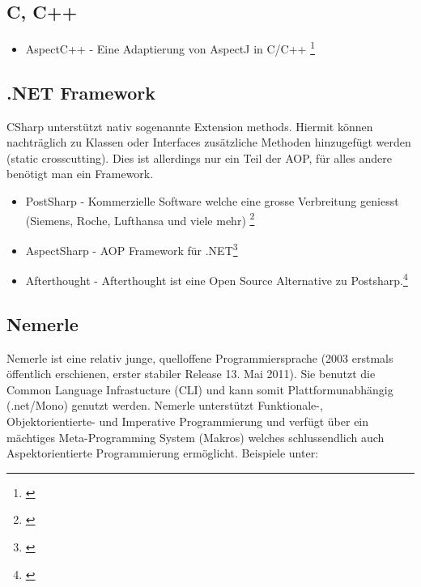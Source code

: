 \subsection{C, C++}

\begin{itemize}
\item AspectC++ - Eine Adaptierung von AspectJ in C/C++ \footnote{\cite{net:aspectc}}
\end{itemize}

\subsection{.NET Framework}

CSharp unterstützt nativ sogenannte Extension methods. Hiermit können nachträglich zu Klassen oder Interfaces zusätzliche Methoden hinzugefügt werden (static crosscutting). Dies ist allerdings nur ein Teil der AOP, für alles andere benötigt man ein Framework.

\begin{itemize}
\item PostSharp - Kommerzielle Software welche eine grosse Verbreitung geniesst (Siemens, Roche, Lufthansa und viele mehr) \footnote{\cite{net:postsharp}}
\item AspectSharp - AOP Framework für .NET\footnote{\cite{net:aspectsharp}}
\item Afterthought - Afterthought ist eine Open Source Alternative zu Postsharp.\footnote{\cite{net:afterthought}}
\end{itemize}

\subsection{Nemerle}
Nemerle ist eine relativ junge, quelloffene Programmiersprache (2003 erstmals öffentlich erschienen, erster stabiler Release 13. Mai 2011). Sie benutzt die Common Language Infrastucture (CLI) und kann somit Plattformunabhängig (.net/Mono) genutzt werden. 
Nemerle unterstützt Funktionale-, Objektorientierte- und Imperative Programmierung und verfügt über ein mächtiges Meta-Programming System (Makros) welches schlussendlich auch Aspektorientierte Programmierung ermöglicht. Beispiele unter: \citet{github:nemerleaopsrc}